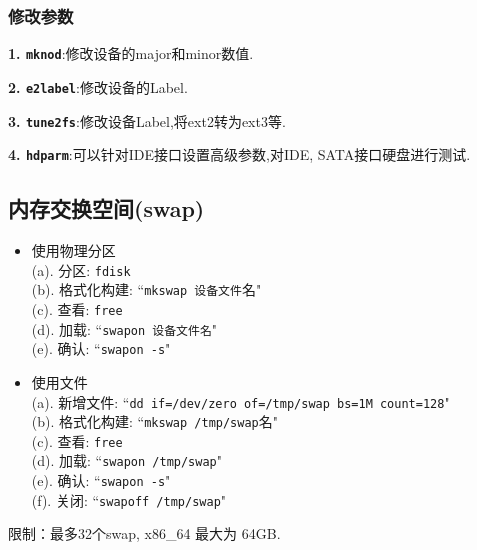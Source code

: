 \subsubsection{修改参数}
\par
\textbf{1. \texttt{mknod}}:修改设备的major和minor数值.

\par
\textbf{2. \texttt{e2label}}:修改设备的Label.

\par
\textbf{3. \texttt{tune2fs}}:修改设备Label,将ext2转为ext3等.

\par
\textbf{4. \texttt{hdparm}}:可以针对IDE接口设置高级参数,对IDE, SATA接口硬盘进行测试.

\subsection{内存交换空间(swap)}
\begin{itemize}
    \item 使用物理分区\\
    (a). 分区: \texttt{fdisk} \\
    (b). 格式化构建: ``\texttt{mkswap 设备文件}名" \\
    (c). 查看: \texttt{free} \\
    (d). 加载: ``\texttt{swapon 设备文件名}" \\
    (e). 确认: ``\texttt{swapon -s}"

    \item 使用文件\\
    (a). 新增文件: ``\texttt{dd if=/dev/zero of=/tmp/swap bs=1M count=128}" \\
    (b). 格式化构建: ``\texttt{mkswap /tmp/swap}名" \\
    (c). 查看: \texttt{free} \\
    (d). 加载: ``\texttt{swapon /tmp/swap}" \\
    (e). 确认: ``\texttt{swapon -s}" \\
    (f). 关闭: ``\texttt{swapoff /tmp/swap}"
\end{itemize}
限制：最多32个swap, x86\_64 最大为 64GB.
